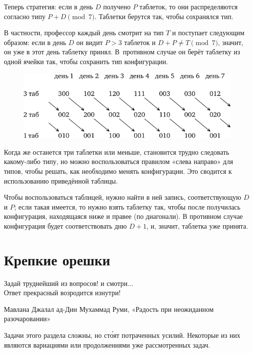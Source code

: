 \documentclass[twoside]{book}
\begin{document}
Теперь стратегия: если в день $D$ получено $P$ таблеток, то они распределяются согласно типу $P+D \pmod 7$.
Таблетки берутся так, чтобы сохранялся тип.

В частности, профессор каждый день смотрит на тип $T$ и поступает следующим образом:
если в день $D$ он видит $P>3$ таблеток и $D+P\ne T\pmod 7$, значит, он уже в этот день таблетку принял.
В~противном случае он берёт таблетку из одной ячейки так, чтобы сохранить тип конфигурации.

\begin{figure}[!ht]
\centering
\includegraphics{mp/wink-26}
\end{figure}

Когда же останется три таблетки или меньше, становится трудно
следовать какому-либо типу, но можно воспользоваться правилом «слева направо» для типов, чтобы решать, как необходимо менять конфигурации.
Это сводится к использованию приведённой таблицы.

Чтобы воспользоваться таблицей, нужно найти в ней запись, соответствующую $D$ и $P$;
если такая имеется, то нужно взять таблетку так, чтобы после получилась конфигурация, находящаяся ниже и правее (по диагонали).
В противном случае конфигурация будет соответствовать дню $D+1$, и, значит, таблетка уже принята.

\chapter{Крепкие орешки}

\thispagestyle{empty}

\setlength{\epigraphwidth}{.55\textwidth}
\epigraph{Задай  труднейший  из  вопросов!  и  смотри...\\
Ответ  прекрасный  возродится  изнутри!\vspace{1ex}}{Мавлана Джалал ад-Дин Мухаммад Руми, «Радость   при   неожиданном разочаровании»
}

Задачи этого раздела сложны, но ст\'{о}ят потраченных усилий.
Некоторые из них являются вариациями или продолжениями уже рассмотренных задач.
\end{document}
